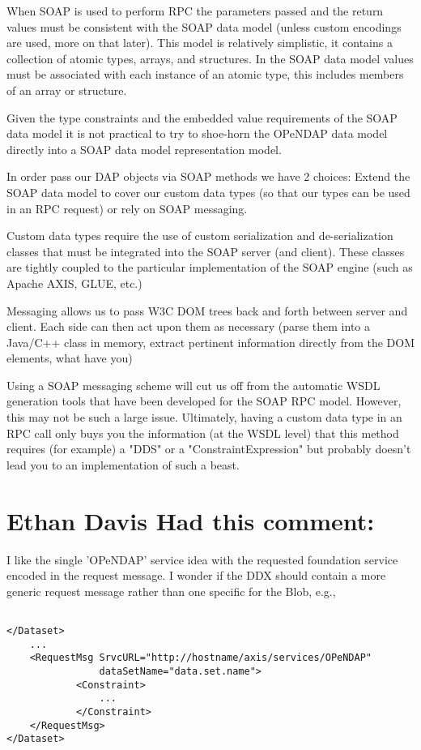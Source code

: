 \documentclass[justify]{dods-paper}
\begin{document}
When SOAP is used to perform RPC the parameters passed and the return
values must be consistent with the SOAP data model (unless custom
encodings are used, more on that later). This model is relatively
simplistic, it contains a collection of atomic types, arrays, and
structures. In the SOAP data model values must be associated with each
instance of an atomic type, this includes members of an array or
structure.

Given the type constraints and the embedded value requirements of the
SOAP data model it is not practical to try to shoe-horn the OPeNDAP
data model directly into a SOAP data model representation model.

In order pass our DAP objects via SOAP methods we have 2 choices:
Extend the SOAP data model to cover our custom data types (so that our
types can be used in an RPC request) or rely on SOAP messaging.

Custom data types require the use of custom serialization and
de-serialization classes that must be integrated into the SOAP server
(and client). These classes are tightly coupled to the particular
implementation of the SOAP engine (such as Apache AXIS, GLUE, etc.)

Messaging allows us to pass W3C DOM trees back and forth between
server and client. Each side can then act upon them as necessary
(parse them into a Java/C++ class in memory, extract pertinent
information directly from the DOM elements, what have you)

Using a SOAP messaging scheme will cut us off from the automatic WSDL
generation tools that have been developed for the SOAP RPC model.
However, this may not be such a large issue. Ultimately, having a
custom data type in an RPC call only buys you the information (at the
WSDL level) that this method requires (for example) a "DDS" or a
"ConstraintExpression" but probably doesn't lead you to an
implementation of such a beast.

\section{Ethan Davis Had this comment:}

I like the single 'OPeNDAP' service idea with the requested foundation
service encoded in the request message. I wonder if the DDX should
contain a more generic request message rather than one specific for
the Blob, e.g.,

\begin{verbatim}

</Dataset>
    ...
    <RequestMsg SrvcURL="http://hostname/axis/services/OPeNDAP"
                dataSetName="data.set.name">
            <Constraint>
                ...
            </Constraint>
    </RequestMsg>
</Dataset>

\end{verbatim}
\end{document}
